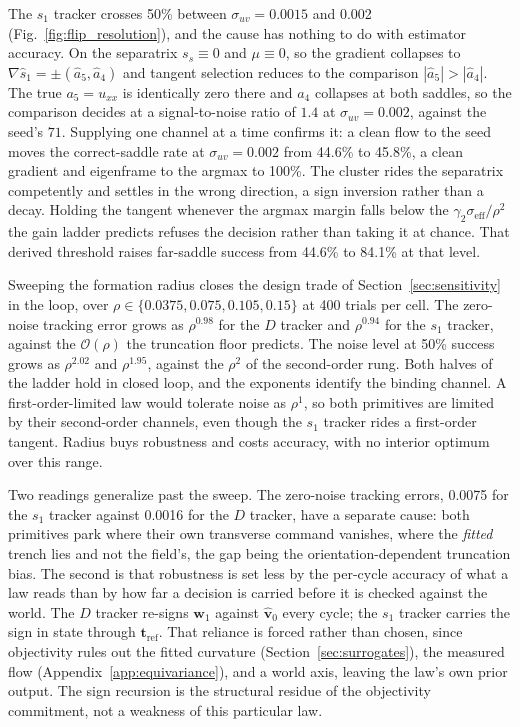 \documentclass[lettersize,journal]{IEEEtran}
\begin{document}
The $s_1$ tracker crosses 50\% between $\sigma_{uv} = 0.0015$ and 0.002
(Fig.~\ref{fig:flip_resolution}), and the cause has nothing to do with
estimator accuracy. On the separatrix $s_s \equiv 0$ and $\mu \equiv 0$, so the gradient collapses to $\nabla\hat{s}_1 = \pm(\hat{a}_5, \hat{a}_4)$ and tangent selection reduces to the comparison $|\hat{a}_5| > |\hat{a}_4|$. The true $a_5 = u_{xx}$ is identically zero there and $a_4$ collapses at both saddles, so the comparison decides at a signal-to-noise ratio of $1.4$ at $\sigma_{uv} = 0.002$, against the seed's $71$. Supplying one channel at a time confirms it: a clean flow to the seed
moves the correct-saddle rate at $\sigma_{uv} = 0.002$ from 44.6\% to
45.8\%, a clean gradient and eigenframe to the argmax to 100\%. The cluster rides the separatrix competently and settles in the wrong
direction, a sign inversion rather than a decay. Holding the tangent whenever the argmax margin falls below the $\gamma_2\sigma_{\mathrm{eff}}/\rho^2$ the gain ladder predicts refuses the decision rather than taking it at chance. That derived threshold raises far-saddle success from 44.6\% to 84.1\% at that level.

Sweeping the formation radius closes the design trade of
Section~\ref{sec:sensitivity} in the loop, over $\rho \in \{0.0375,
0.075, 0.105, 0.15\}$ at 400 trials per cell. The zero-noise tracking
error grows as $\rho^{0.98}$ for the $D$ tracker and $\rho^{0.94}$ for
the $s_1$ tracker, against the $\mathcal{O}(\rho)$ the truncation floor
predicts. The noise level at 50\% success grows as $\rho^{2.02}$ and
$\rho^{1.95}$, against the $\rho^2$ of the second-order rung. Both halves of the ladder hold in closed loop, and the exponents identify the binding channel. A first-order-limited law would tolerate noise as $\rho^1$, so both primitives are limited by their second-order channels, even though the $s_1$ tracker rides a first-order tangent. Radius buys robustness and costs accuracy, with no interior optimum
over this range.

Two readings generalize past the sweep. The zero-noise tracking errors, 0.0075 for the $s_1$ tracker against 0.0016 for the $D$ tracker, have a separate cause: both primitives park where their own transverse command vanishes, where the \emph{fitted} trench lies and not the field's, the gap being the orientation-dependent truncation bias. The second is that robustness is set less by the per-cycle accuracy of what a law reads than by how far a decision is carried before it is checked against the world. The $D$ tracker re-signs $\mathbf{w}_1$ against $\hat{\mathbf{v}}_0$ every cycle; the $s_1$ tracker carries the sign in state through $\mathbf{t}_{\text{ref}}$. That reliance is forced rather than chosen,
since objectivity rules out the fitted curvature
(Section~\ref{sec:surrogates}), the measured flow
(Appendix~\ref{app:equivariance}), and a world axis, leaving the
law's own prior output. The sign recursion is the structural residue of
the objectivity commitment, not a weakness of this particular
law.
\end{document}
